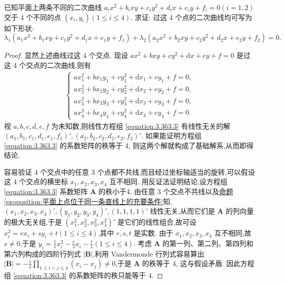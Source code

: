 \documentclass[../../main.tex]{subfiles}%
\begin{document}
\begin{example}
已知平面上两条不同的二次曲线 \(a_ix^2 + b_ixy + c_iy^2 + d_ix + e_iy + f_i = 0(i = 1,2)\) 交于 4 个不同的点 \((x_i,y_i)(1\leqslant  i\leqslant  4)\). 求证: 过这 4 个点的二次曲线均可写为如下形状:
\[
\lambda_1(a_1x^2 + b_1xy + c_1y^2 + d_1x + e_1y + f_1)+\lambda_2(a_2x^2 + b_2xy + c_2y^2 + d_2x + e_2y + f_2)=0.
\]
\end{example}
\begin{proof}
显然上述曲线过这 4 个交点. 现设 \(ax^2 + bxy + cy^2 + \mathrm{d}x + ey + f = 0\) 是过这 4 个交点的二次曲线,则有
\begin{align}\label{equation:3.363.3}
\begin{cases}
ax_1^2 + bx_1y_1 + cy_1^2 + \mathrm{d}x_1 + ey_1 + f = 0,\\
ax_2^2 + bx_2y_2 + cy_2^2 + \mathrm{d}x_2 + ey_2 + f = 0,\\
ax_3^2 + bx_3y_3 + cy_3^2 + \mathrm{d}x_3 + ey_3 + f = 0,\\
ax_4^2 + bx_4y_4 + cy_4^2 + \mathrm{d}x_4 + ey_4 + f = 0.
\end{cases}
\end{align}
视 \(a,b,c,d,e,f\) 为未知数,则线性方程组 \eqref{equation:3.363.3} 有线性无关的解 \((a_1,b_1,c_1,d_1,e_1,f_1)',(a_2,b_2,c_2,d_2,e_2,f_2)'\). 如果能证明方程组 \eqref{equation:3.363.3} 的系数矩阵的秩等于 4, 则这两个解就构成了基础解系,从而即得结论.

容易验证 4 个交点中的任意 3 个点都不共线,而且经过坐标轴适当的旋转,可以假设这 4 个交点的横坐标 \(x_1,x_2,x_3,x_4\) 互不相同. 用反证法证明结论,设方程组 \eqref{equation:3.363.3} 系数矩阵 \(\boldsymbol{A}\) 的秩小于4. 由任意 3 个交点不共线以及\hyperref[proposition:平面上点位于同一条直线上的充要条件]{命题\ref{proposition:平面上点位于同一条直线上的充要条件}}知,\((x_1,x_2,x_3,x_4)',(y_1,y_2,y_3,y_4)',(1,1,1,1)'\) 线性无关,从而它们是 \(\boldsymbol{A}\) 的列向量的极大无关组,于是 \((x_1^2,x_2^2,x_3^2,x_4^2)'\) 是它们的线性组合,故可设 \(x_i^2 = rx_i + sy_i + t(1\leqslant  i\leqslant  4)\),其中 \(r,s,t\) 是实数. 由于 \(x_1,x_2,x_3,x_4\) 互不相同,故 \(s\neq 0\),于是 \(y_i = \frac{1}{s}x_i^2 - \frac{r}{s}x_i - \frac{t}{s}(1\leqslant  i\leqslant  4)\). 考虑 \(\boldsymbol{A}\) 的第一列、第二列、第四列和第六列构成的四阶行列式 \(|\boldsymbol{B}|\),利用 Vandermonde 行列式容易算出 \(|\boldsymbol{B}|=-\frac{1}{s}\prod\limits_{1\leqslant  i < j\leqslant  4}(x_i - x_j)\neq 0\),于是 \(\boldsymbol{A}\) 的秩等于 4, 这与假设矛盾. 因此方程组 \eqref{equation:3.363.3} 的系数矩阵的秩只能等于 4.
\end{proof}
\end{document}
